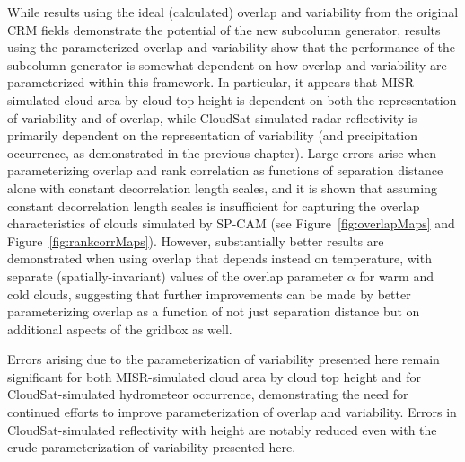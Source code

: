 While results using the ideal (calculated) overlap and variability from
the original CRM fields demonstrate the potential of the new subcolumn
generator, results using the parameterized overlap and variability show
that the performance of the subcolumn generator is somewhat dependent on
how overlap and variability are parameterized within this framework. In
particular, it appears that MISR-simulated cloud area by cloud top
height is dependent on both the representation of variability and of
overlap, while CloudSat-simulated radar reflectivity is primarily
dependent on the representation of variability (and precipitation
occurrence, as demonstrated in the previous chapter). Large errors arise
when parameterizing overlap and rank correlation as functions of
separation distance alone with constant decorrelation length scales, and
it is shown that assuming constant decorrelation length scales is
insufficient for capturing the overlap characteristics of clouds
simulated by SP-CAM (see Figure~\ref{fig:overlapMaps} and
Figure~\ref{fig:rankcorrMaps}). However, substantially better results
are demonstrated when using overlap that depends instead on temperature,
with separate (spatially-invariant) values of the overlap parameter
\(\alpha\) for warm and cold clouds, suggesting that further
improvements can be made by better parameterizing overlap as a function
of not just separation distance but on additional aspects of the gridbox
as well.

Errors arising due to the parameterization of variability presented here
remain significant for both MISR-simulated cloud area by cloud top
height and for CloudSat-simulated hydrometeor occurrence, demonstrating
the need for continued efforts to improve parameterization of overlap
and variability. Errors in CloudSat-simulated reflectivity with height
are notably reduced even with the crude parameterization of variability
presented here.

